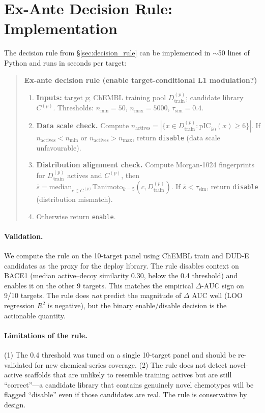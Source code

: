 \documentclass[sigconf]{acmart}
\begin{document}
\section{Ex-Ante Decision Rule: Implementation}
\label{app:decision_rule}

The decision rule from \S\ref{sec:decision_rule} can be implemented in $\sim$50 lines of Python and runs in seconds per target:

\begin{quote}
\textbf{Ex-ante decision rule (enable target-conditional L1 modulation?)}
\begin{enumerate}[noitemsep,topsep=1pt,leftmargin=*]
\item \textbf{Inputs:} target $p$; ChEMBL training pool $D_{\text{train}}^{(p)}$; candidate library $C^{(p)}$. Thresholds: $n_{\min}=50$, $n_{\max}=5000$, $\tau_{\text{sim}}=0.4$.
\item \textbf{Data scale check.} Compute $n_{\text{actives}} = |\{x \in D_{\text{train}}^{(p)} : \text{pIC}_{50}(x) \geq 6\}|$. If $n_{\text{actives}} < n_{\min}$ or $n_{\text{actives}} > n_{\max}$, return \texttt{disable} (data scale unfavourable).
\item \textbf{Distribution alignment check.} Compute Morgan-1024 fingerprints for $D_{\text{train}}^{(p)}$ actives and $C^{(p)}$, then $\bar{s} = \mathrm{median}_{c \in C^{(p)}} \mathrm{Tanimoto}_{k=5}(c, D_{\text{train}}^{(p)})$. If $\bar{s} < \tau_{\text{sim}}$, return \texttt{disable} (distribution mismatch).
\item Otherwise return \texttt{enable}.
\end{enumerate}
\end{quote}

\paragraph{Validation.} We compute the rule on the 10-target panel using ChEMBL train and DUD-E candidates as the proxy for the deploy library. The rule disables context on BACE1 (median active--decoy similarity 0.30, below the 0.4 threshold) and enables it on the other 9 targets. This matches the empirical $\Delta$-AUC sign on 9/10 targets. The rule does \emph{not} predict the magnitude of $\Delta$ AUC well (LOO regression $R^2$ is negative), but the binary enable/disable decision is the actionable quantity.

\paragraph{Limitations of the rule.} (1) The 0.4 threshold was tuned on a single 10-target panel and should be re-validated for new chemical-series coverage. (2) The rule does not detect novel-active scaffolds that are unlikely to resemble training actives but are still ``correct''---a candidate library that contains genuinely novel chemotypes will be flagged ``disable'' even if those candidates are real. The rule is conservative by design.
\end{document}
